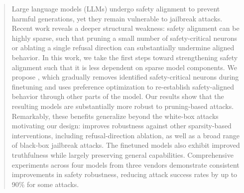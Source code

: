 \begin{abstract}


Large language models (LLMs) undergo safety alignment to prevent harmful generations, yet they remain vulnerable to jailbreak attacks. Recent work reveals a deeper structural weakness: safety alignment can be highly sparse, such that pruning a small number of safety-critical neurons or ablating a single refusal direction can substantially undermine aligned behavior. In this work, we take the first steps toward strengthening safety alignment such that it is less dependent on sparse model components. We propose \method, which gradually removes identified safety-critical neurons during finetuning and uses preference optimization to re-establish safety-aligned behavior through other parts of the model. Our results show that the resulting models are substantially more robust to pruning-based attacks. Remarkably, these benefits generalize beyond the white-box attacks motivating our design: \method improves robustness against other sparsity-based interventions, including refusal-direction ablation, as well as a broad range of black-box jailbreak attacks. The finetuned models also exhibit improved truthfulness while largely preserving general capabilities. Comprehensive experiments across four models from three vendors demonstrate consistent improvements in safety robustness, reducing attack success rates by up to 90\% for some attacks.

\end{abstract}




